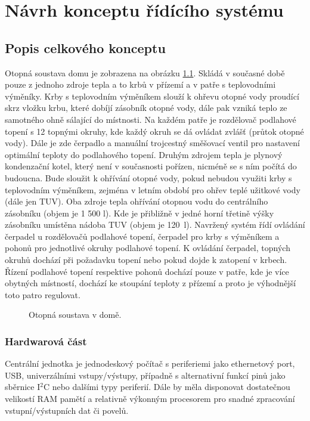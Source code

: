 \chapter{Návrh konceptu řídícího systému}

\section{Popis celkového konceptu}

Otopná soustava domu je zobrazena na obrázku \ref{fig:otopna-soustava-rez-domu}. Skládá v současné době pouze z jednoho zdroje tepla a to krbů v přízemí a v patře s teplovodními výměníky. Krby s teplovodním výměníkem slouží k ohřevu otopné vody proudící skrz vložku krbu, které dobíjí zásobník otopné vody, dále pak vzniká teplo ze samotného ohně sálající do místnosti. Na každém patře je rozdělovač podlahové topení s 12 topnými okruhy, kde každý okruh se dá ovládat zvlášť (průtok otopné vody). Dále je zde čerpadlo a manuální trojcestný směšovací ventil pro nastavení optimální teploty do podlahového topení. Druhým zdrojem tepla je plynový kondenzační kotel, který není v současnosti pořízen, nicméně se s ním počítá do budoucna. Bude sloužit k ohřívání otopné vody, pokud nebudou využiti krby s teplovodním výměníkem, zejména v letním období pro ohřev teplé užitkové vody (dále jen TUV). Oba zdroje tepla ohřívání otopnou vodu do centrálního zásobníku (objem je 1 500 l). Kde je přibližně v jedné horní třetině výšky zásobníku umístěna nádoba TUV (objem je 120~l). Navržený systém řídí ovládání čerpadel u rozdělovačů podlahové topení, čerpadel pro krby s výměníkem a pohonů pro jednotlivé okruhy podlahové topení. K ovládání čerpadel, topných okruhů dochází při požadavku topení nebo pokud dojde k zatopení v krbech. Řízení podlahové topení respektive pohonů dochází pouze v patře, kde je více obytných místností, dochází ke stoupání teploty z přízemí a proto je výhodnější toto patro regulovat. 


\begin{figure}[H]
    \centering
    \def\svgwidth{\columnwidth}
    
    \caption{Otopná soustava v domě.}
    \label{fig:otopna-soustava-rez-domu}
\end{figure}

\subsection{Hardwarová část}

Centrální jednotka je jednodeskový počítač s periferiemi jako ethernetový port, USB, univerzálními vstupy/výstupy, případně s alternativní funkcí pinů jako sběrnice I$^2$C nebo dalšími typy periferií. Dále by měla disponovat dostatečnou velikostí RAM pamětí a relativně výkonným procesorem pro snadné zpracování vstupní/výstupních dat či povelů.


